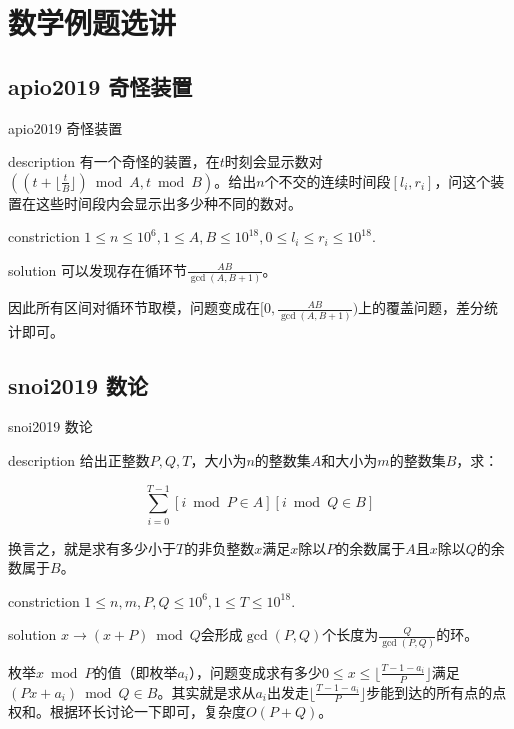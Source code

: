 \documentclass{beamer}
\begin{document}
	\section{数学例题选讲}
	\subsection{apio2019 奇怪装置}
	\begin{frame}{apio2019 奇怪装置}
		\begin{block}{description}
			有一个奇怪的装置，在$t$时刻会显示数对$((t+\lfloor\frac tB\rfloor) \bmod A, t \bmod B)$。给出$n$个不交的连续时间段$[l_i,r_i]$，问这个装置在这些时间段内会显示出多少种不同的数对。
		\end{block}
		\begin{block}{constriction}
			$1 \le n \le 10^6, 1 \le A, B \le 10^{18}, 0 \le l_i \le r_i \le 10^{18}.$
		\end{block}
		\pause
		\begin{block}{solution}
			可以发现存在循环节$\frac{AB}{\gcd(A,B+1)}$。
			
			因此所有区间对循环节取模，问题变成在$[0,\frac{AB}{\gcd(A,B+1)})$上的覆盖问题，差分统计即可。
		\end{block}
	\end{frame}
	\subsection{snoi2019 数论}
	\begin{frame}{snoi2019 数论}
		\begin{block}{description}
			给出正整数$P,Q,T$，大小为$n$的整数集$A$和大小为$m$的整数集$B$，求：
			
			$$\sum_{i=0}^{T-1}[i \bmod P \in A][i \bmod Q \in B]$$
			
			换言之，就是求有多少小于$T$的非负整数$x$满足$x$除以$P$的余数属于$A$且$x$除以$Q$的余数属于$B$。
		\end{block}
		\begin{block}{constriction}
			$1 \le n, m, P, Q \le 10^6, 1 \le T \le 10^{18}.$
		\end{block}
		\pause
		\begin{block}{solution}
			$x\to (x+P) \bmod Q$会形成$\gcd(P,Q)$个长度为$\frac{Q}{\gcd(P,Q)}$的环。
		
			枚举$x\bmod P$的值（即枚举$a_i$），问题变成求有多少$0\le x\le \lfloor\frac{T-1-a_i}{P}\rfloor$满足$(Px+a_i)\bmod Q\in B$。其实就是求从$a_i$出发走$\lfloor\frac{T-1-a_i}{P}\rfloor$步能到达的所有点的点权和。根据环长讨论一下即可，复杂度$O(P+Q)$。
		\end{block}
	\end{frame}
\end{document}
